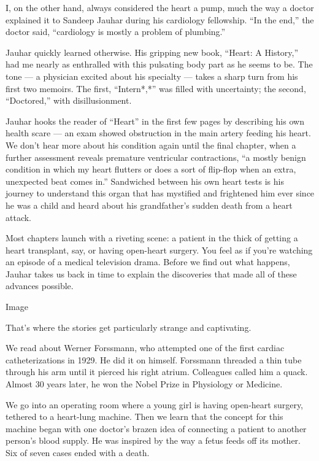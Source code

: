 I, on the other hand, always considered the heart a pump, much the way a
doctor explained it to Sandeep Jauhar during his cardiology fellowship.
``In the end,'' the doctor said, ``cardiology is mostly a problem of
plumbing.''

Jauhar quickly learned otherwise. His gripping new book, ``Heart: A
History,'' had me nearly as enthralled with this pulsating body part as
he seems to be. The tone --- a physician excited about his specialty ---
takes a sharp turn from his first two memoirs. The first, ``Intern*,*''
was filled with uncertainty; the second, ``Doctored,'' with
disillusionment.

Jauhar hooks the reader of ``Heart'' in the first few pages by
describing his own health scare --- an exam showed obstruction in the
main artery feeding his heart. We don't hear more about his condition
again until the final chapter, when a further assessment reveals
premature ventricular contractions, ``a mostly benign condition in which
my heart flutters or does a sort of flip-flop when an extra, unexpected
beat comes in.'' Sandwiched between his own heart tests is his journey
to understand this organ that has mystified and frightened him ever
since he was a child and heard about his grandfather's sudden death from
a heart attack.

Most chapters launch with a riveting scene: a patient in the thick of
getting a heart transplant, say, or having open-heart surgery. You feel
as if you're watching an episode of a medical television drama. Before
we find out what happens, Jauhar takes us back in time to explain the
discoveries that made all of these advances possible.

Image

That's where the stories get particularly strange and captivating.

We read about Werner Forssmann, who attempted one of the first cardiac
catheterizations in 1929. He did it on himself. Forssmann threaded a
thin tube through his arm until it pierced his right atrium. Colleagues
called him a quack. Almost 30 years later, he won the Nobel Prize in
Physiology or Medicine.

We go into an operating room where a young girl is having open-heart
surgery, tethered to a heart-lung machine. Then we learn that the
concept for this machine began with one doctor's brazen idea of
connecting a patient to another person's blood supply. He was inspired
by the way a fetus feeds off its mother. Six of seven cases ended with a
death.

